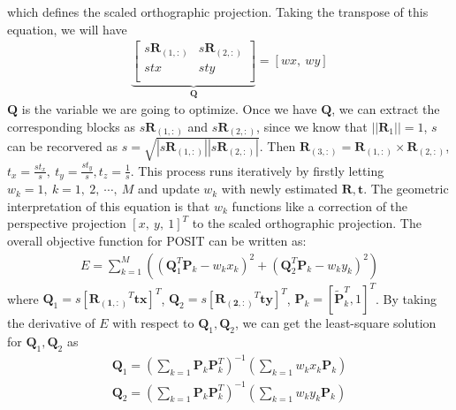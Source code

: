 \documentclass[a4paper]{report}
\begin{document}
which defines the scaled orthographic projection. Taking the transpose of this equation, we will have
\begin{align*}
[X,\ Y,\ Z,\ 1]
\underbrace{\left[
\begin{matrix}
s\mathbf{R}_{(1,:)} & s\mathbf{R}_{(2,:)} \\ 
stx & sty \\ 
\end{matrix}
\right]}_{\mathbf{Q}}=[wx,\ wy]
\end{align*}
$\mathbf{Q}$ is the variable we are going to optimize. Once we have $\mathbf{Q}$, we can extract the corresponding blocks as $s\mathbf{R}_{(1,:)}$ and $s\mathbf{R}_{(2,:)}$, since we know that $||\mathbf{R}_1||=1$, $s$ can be recorvered as $s=\sqrt{|s\mathbf{R}_{(1,:)}||s\mathbf{R}_{(2,:)}|}$. Then $\mathbf{R}_{(3,:)}=\mathbf{R}_{(1,:)} \times \mathbf{R}_{(2,:)}$, $t_x = \frac{st_x}{s},\ t_y=\frac{st_y}{s}, t_z=\frac{1}{s}$. This process runs iteratively by firstly letting $w_k=1,\ k=1,\ 2,\ \cdots,\ M$ and update $w_k$ with newly estimated $\mathbf{R}, \mathbf{t}$. The geometric interpretation of this equation is that $w_k$ functions like a correction of the perspective projection $[x,\ y,\ 1]^T$ to the scaled orthographic projection. The overall objective function for POSIT can be written as:
\begin{align*}
E=\sum_{k=1}^{M}\left(
\left(
\mathbf{Q}_1^T \mathbf{P}_k - w_kx_k
\right)^2+
\left(
\mathbf{Q}_2^T \mathbf{P}_k - w_ky_k
\right)^2
\right)
\end{align*}
where $\mathbf{Q}_1=s[\mathbf{R_{(1,:)}}^T \mathbf{tx}]^T$, $\mathbf{Q}_2=s[\mathbf{R_{(2,:)}}^T \mathbf{ty}]^T$, $\mathbf{P}_k=[\tilde{\mathbf{P}}_k^T, 1]^T$. By taking the derivative of $E$ with respect to $\mathbf{Q}_1, \mathbf{Q}_2$, we can get the least-square solution for $\mathbf{Q}_1, \mathbf{Q}_2$ as
\begin{align*}
\mathbf{Q}_1=\left(
\sum_{k=1}\mathbf{P}_k\mathbf{P}_k^T
\right)^{-1}\left(
\sum_{k=1} w_kx_k\mathbf{P}_k
\right) \\
\mathbf{Q}_2=\left(
\sum_{k=1}\mathbf{P}_k\mathbf{P}_k^T
\right)^{-1}\left(
\sum_{k=1} w_ky_k\mathbf{P}_k
\right)
\end{align*}
\end{document}

